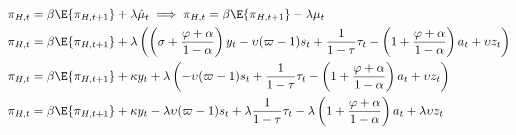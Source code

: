 \begin{align}
    \pi_{H,t} &= \beta \E \{\pi_{H,t+1}\} + \lambda \hat{\mu}_t \implies \pi_{H,t} = \beta \E \{\pi_{H,t+1}\} - \lambda \mu_t \\
    \pi_{H,t} &= \beta \E \{\pi_{H,t+1}\} + \lambda \left(\left(\sigma + \frac{\varphi + \alpha}{1-\alpha}\right)y_t - \upsilon (\varpi - 1) s_t + \frac{1}{1-\tau}\tau_t  - \left(1 + \frac{\varphi + \alpha}{1-\alpha}\right)a_t + \upsilon z_t\right) \\
    \pi_{H,t} &= \beta \E \{\pi_{H,t+1}\} + \kappa y_t + \lambda \left(- \upsilon (\varpi - 1) s_t + \frac{1}{1-\tau}\tau_t  - \left(1 + \frac{\varphi + \alpha}{1-\alpha}\right)a_t + \upsilon z_t\right) \\
    \pi_{H,t} &= \beta \E \{\pi_{H,t+1}\} + \kappa y_t - \lambda \upsilon (\varpi - 1) s_t + \lambda\frac{1}{1-\tau}\tau_t  - \lambda\left(1 + \frac{\varphi + \alpha}{1-\alpha}\right)a_t + \lambda\upsilon z_t \\
\end{align}
\pagebreak
